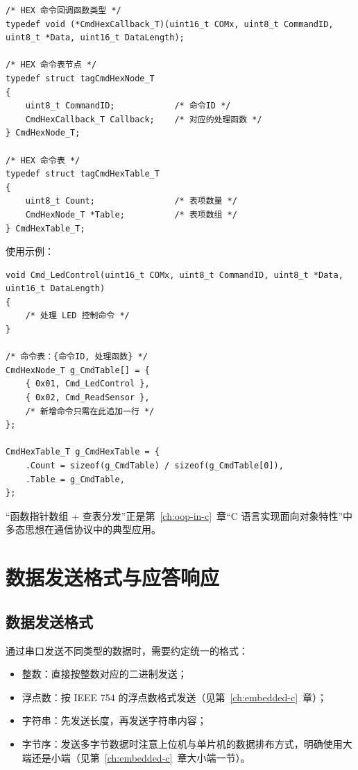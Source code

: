 \begin{lstlisting}[style=c]
/* HEX 命令回调函数类型 */
typedef void (*CmdHexCallback_T)(uint16_t COMx, uint8_t CommandID, uint8_t *Data, uint16_t DataLength);

/* HEX 命令表节点 */
typedef struct tagCmdHexNode_T
{
    uint8_t CommandID;            /* 命令ID */
    CmdHexCallback_T Callback;    /* 对应的处理函数 */
} CmdHexNode_T;

/* HEX 命令表 */
typedef struct tagCmdHexTable_T
{
    uint8_t Count;                /* 表项数量 */
    CmdHexNode_T *Table;          /* 表项数组 */
} CmdHexTable_T;
\end{lstlisting}

使用示例：

\begin{lstlisting}[style=c]
void Cmd_LedControl(uint16_t COMx, uint8_t CommandID, uint8_t *Data, uint16_t DataLength)
{
    /* 处理 LED 控制命令 */
}

/* 命令表：{命令ID, 处理函数} */
CmdHexNode_T g_CmdTable[] = {
    { 0x01, Cmd_LedControl },
    { 0x02, Cmd_ReadSensor },
    /* 新增命令只需在此追加一行 */
};

CmdHexTable_T g_CmdHexTable = {
    .Count = sizeof(g_CmdTable) / sizeof(g_CmdTable[0]),
    .Table = g_CmdTable,
};
\end{lstlisting}

“函数指针数组 + 查表分发”正是第~\ref{ch:oop-in-c}~章“C 语言实现面向对象特性”中多态思想在通信协议中的典型应用。

\section{数据发送格式与应答响应}

\subsection{数据发送格式}

通过串口发送不同类型的数据时，需要约定统一的格式：

\begin{itemize}
\item 整数：直接按整数对应的二进制发送；
\item 浮点数：按 IEEE 754 的浮点数格式发送（见第~\ref{ch:embedded-c}~章）；
\item 字符串：先发送长度，再发送字符串内容；
\item 字节序：发送多字节数据时注意上位机与单片机的数据排布方式，明确使用大端还是小端（见第~\ref{ch:embedded-c}~章大小端一节）。
\end{itemize}

